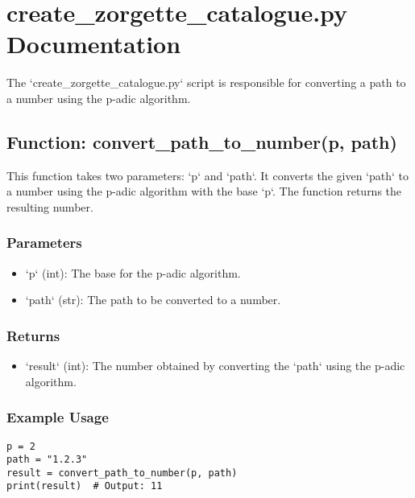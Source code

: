 \documentclass{article}
\begin{document}
\section{create\_zorgette\_catalogue.py Documentation}

The `create\_zorgette\_catalogue.py` script is responsible for converting a path to a number using the p-adic algorithm.

\subsection{Function: convert\_path\_to\_number(p, path)}

This function takes two parameters: `p` and `path`. It converts the given `path` to a number using the p-adic algorithm with the base `p`. The function returns the resulting number.

\subsubsection*{Parameters}

\begin{itemize}
  \item `p` (int): The base for the p-adic algorithm.
  \item `path` (str): The path to be converted to a number.
\end{itemize}

\subsubsection*{Returns}

\begin{itemize}
  \item `result` (int): The number obtained by converting the `path` using the p-adic algorithm.
\end{itemize}

\subsubsection*{Example Usage}

\begin{verbatim}
p = 2
path = "1.2.3"
result = convert_path_to_number(p, path)
print(result)  # Output: 11
\end{verbatim}
\end{document}
